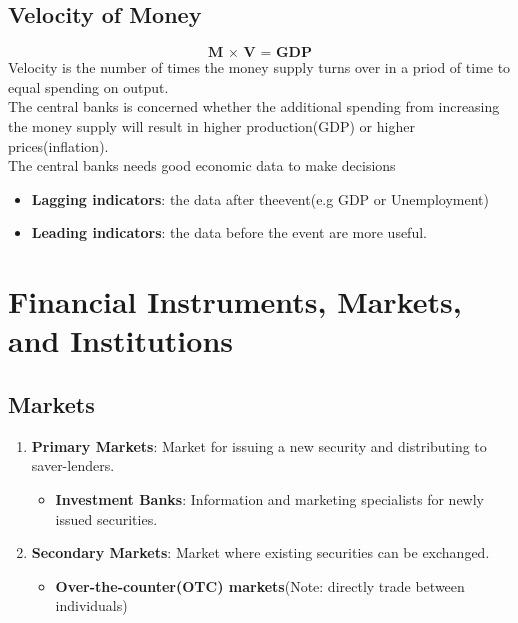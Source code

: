 \documentclass{article}
\theoremstyle{definition}
\theoremstyle{thrm}
\theoremstyle{lma}
\theoremstyle{ppst}
\theoremstyle{crlr}
\begin{document}
\subsection{Velocity of Money}
\begin{equation*}
	\textbf{M $\times$ V = GDP}
\end{equation*}
Velocity is the number of times the money supply turns over in a priod of time to equal spending on output. \\
The central banks is concerned whether the additional spending from increasing the money supply will result in higher production(GDP) or higher prices(inflation).\\
The central banks needs good economic data to make decisions
\begin{itemize}
	\item \textbf{Lagging indicators}: the data after theevent(e.g GDP or Unemployment)
	\item \textbf{Leading indicators}: the data before the event are more useful. 
\end{itemize}


\section{Financial Instruments, Markets, and Institutions}
\subsection{Markets}
\begin{enumerate}
	\item \textbf{Primary Markets}: Market for issuing a new security and distributing to saver-lenders.
	\begin{itemize}
		\item \textbf{Investment Banks}: Information and marketing specialists for newly issued securities.
	\end{itemize}
	\item \textbf{Secondary Markets}: Market where existing securities can be exchanged.
	\begin{itemize}
		\item \textbf{Over-the-counter(OTC) markets}(Note: directly trade between individuals)
	\end{itemize}
\end{enumerate}
\end{document}
